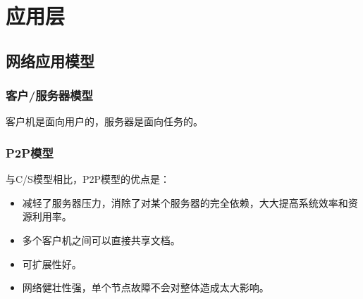 \documentclass[12pt, a4paper, oneside]{ctexart}
\begin{document}




\section{应用层}

\subsection{网络应用模型}

\subsubsection{客户/服务器模型}

客户机是面向用户的，服务器是面向任务的。

\subsubsection{P2P模型}

与C/S模型相比，P2P模型的优点是：
\begin{itemize}
    \item 减轻了服务器压力，消除了对某个服务器的完全依赖，大大提高系统效率和资源利用率。
    \item 多个客户机之间可以直接共享文档。
    \item 可扩展性好。
    \item 网络健壮性强，单个节点故障不会对整体造成太大影响。
\end{itemize}
\end{document}
